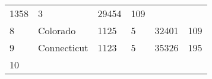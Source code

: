 \documentclass[]{article}
\begin{document}
\begin{longtable}[]{@{}llllll@{}}
\begin{minipage}[t]{0.16\columnwidth}
1358\strut
\end{minipage} & \begin{minipage}[t]{0.12\columnwidth}\raggedright
3\strut
\end{minipage} & \begin{minipage}[t]{0.18\columnwidth}\raggedright
29454\strut
\end{minipage} & \begin{minipage}[t]{0.14\columnwidth}\raggedright
109\strut
\end{minipage}\tabularnewline
\begin{minipage}[t]{0.05\columnwidth}\raggedright
8\strut
\end{minipage} & \begin{minipage}[t]{0.17\columnwidth}\raggedright
Colorado\strut
\end{minipage} & \begin{minipage}[t]{0.16\columnwidth}\raggedright
1125\strut
\end{minipage} & \begin{minipage}[t]{0.12\columnwidth}\raggedright
5\strut
\end{minipage} & \begin{minipage}[t]{0.18\columnwidth}\raggedright
32401\strut
\end{minipage} & \begin{minipage}[t]{0.14\columnwidth}\raggedright
109\strut
\end{minipage}\tabularnewline
\begin{minipage}[t]{0.05\columnwidth}\raggedright
9\strut
\end{minipage} & \begin{minipage}[t]{0.17\columnwidth}\raggedright
Connecticut\strut
\end{minipage} & \begin{minipage}[t]{0.16\columnwidth}\raggedright
1123\strut
\end{minipage} & \begin{minipage}[t]{0.12\columnwidth}\raggedright
5\strut
\end{minipage} & \begin{minipage}[t]{0.18\columnwidth}\raggedright
35326\strut
\end{minipage} & \begin{minipage}[t]{0.14\columnwidth}\raggedright
195\strut
\end{minipage}\tabularnewline
\begin{minipage}[t]{0.05\columnwidth}\raggedright
10\strut
\end{minipage} & \begin{minipage}[t]{0.17\columnwidth}\raggedright

\end{minipage}
\end{longtable}
\end{document}
